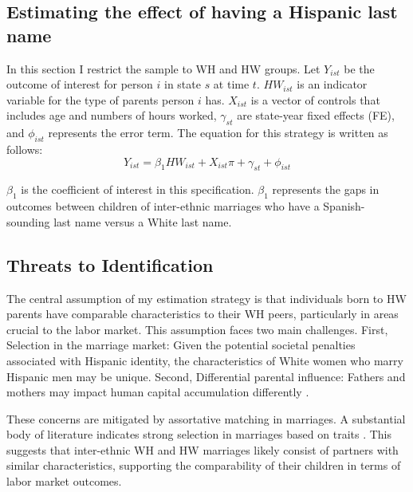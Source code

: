 \documentclass[a4paper,fleqn]{cas-sc}
\begin{document}
\subsection{Estimating the effect of having a Hispanic last name}

In this section I restrict the sample to WH and HW groups. Let $Y_{ist}$ be the outcome of interest for person $i$ in state $s$ at time $t$. $HW_{ist}$ is an indicator variable for the type of parents person $i$ has. $X_{ist}$ is a vector of controls that includes age and numbers of hours worked, $\gamma_{st}$ are state-year fixed effects (FE), and $\phi_{ist}$ represents the error term. The equation for this strategy is written as follows:
\begin{equation} \label{eq:1a}
Y_{ist} = \beta_{1} HW_{ist} + X_{ist} \pi + \gamma_{st} + \phi_{ist}
\end{equation}

$\beta_{1}$ is the coefficient of interest in this specification. $\beta_{1}$ represents the gaps in outcomes between children of inter-ethnic marriages who have a Spanish-sounding last name versus a White last name. 

\subsection{Threats to Identification}

The central assumption of my estimation strategy is that individuals born to HW parents have comparable characteristics to their WH peers, particularly in areas crucial to the labor market. This assumption faces two main challenges. First, Selection in the marriage market: Given the potential societal penalties associated with Hispanic identity, the characteristics of White women who marry Hispanic men may be unique. Second, Differential parental influence: Fathers and mothers may impact human capital accumulation differently \citep{kimball2009risk,magruder2010intergenerational}.

These concerns are mitigated by assortative matching in marriages. A substantial body of literature indicates strong selection in marriages based on traits \citep{averettBetterWorseRelationship2008, beckerTreatiseFamily1993,duncanIntermarriageIntergenerationalTransmission2011}. This suggests that inter-ethnic WH and HW marriages likely consist of partners with similar characteristics, supporting the comparability of their children in terms of labor market outcomes.
\end{document}
